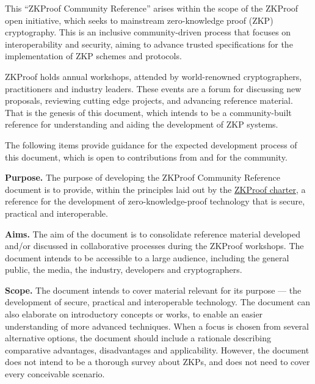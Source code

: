 \label{sec:prelim:about-this-community-reference}

	This ``ZKProof Community Reference'' arises within the scope of the ZKProof open initiative, which seeks to mainstream zero-knowledge proof (ZKP) cryptography.
	This is an inclusive community-driven process that focuses on interoperability and security, aiming to advance trusted specifications for the implementation of ZKP schemes and protocols.


	ZKProof holds annual workshops, attended by world-renowned cryptographers, practitioners and industry leaders.
	These events are a forum for discussing new proposals, reviewing cutting edge projects, and advancing reference material.
	That is the genesis of this document, which intends to be a community-built reference for understanding and aiding the development of ZKP systems.


	The following items provide guidance for the expected development process of this document, which is open to contributions from and for the community.



\textbf{Purpose.}
	The purpose of developing the ZKProof Community Reference document is to provide, 
within the principles laid out by the \hyperref[sec:prelim:charter]{ZKProof charter}, 
a reference for the development of zero-knowledge-proof technology that is secure, practical and interoperable.


\textbf{Aims.}
	The aim of the document is to consolidate reference material developed and/or discussed in collaborative processes during the ZKProof workshops. 
	The document intends to be accessible to a large audience, including the general public, the media, the industry, developers and cryptographers.


\textbf{Scope.}
	The document intends to cover material relevant for its purpose --- the development of secure, practical and interoperable technology.
	The document can also elaborate on introductory concepts or works, to enable an easier understanding of more advanced techniques. 
	When a focus is chosen from several alternative options, the document should include a rationale describing comparative advantages, disadvantages and applicability. 
	However, the document does not intend to be a thorough survey about ZKPs, and does not need to cover every conceivable scenario.


